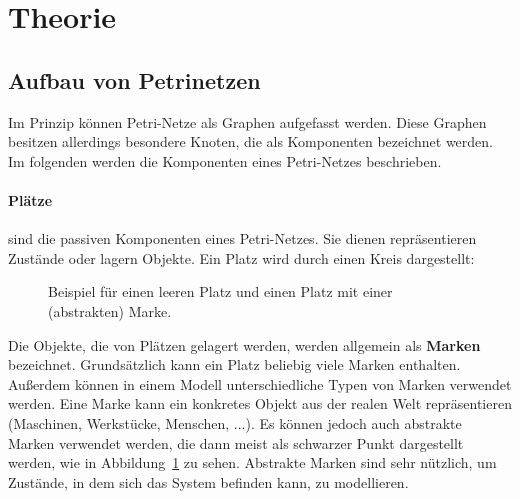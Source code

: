 \section{Theorie}


\subsection{Aufbau von Petrinetzen} %
\label{sub:aufbau_von_petrinetzen}
	Im Prinzip können Petri-Netze als Graphen aufgefasst werden.
	Diese Graphen besitzen allerdings besondere Knoten, die als Komponenten bezeichnet werden.
	Im folgenden werden die Komponenten eines Petri-Netzes beschrieben.

	\paragraph{Plätze} sind die passiven Komponenten eines Petri-Netzes. Sie dienen repräsentieren Zustände oder lagern Objekte.
	Ein Platz wird durch einen Kreis dargestellt:
	\begin{figure}[h]
		\centering
		\caption{Beispiel für einen leeren Platz und einen Platz mit einer (abstrakten) Marke.}
		\label{fig:platz}
	\end{figure}

	Die Objekte, die von Plätzen gelagert werden, werden allgemein als \textbf{Marken} bezeichnet. Grundsätzlich kann ein Platz beliebig viele Marken enthalten. Außerdem können in einem Modell unterschiedliche Typen von Marken verwendet werden. Eine Marke kann ein konkretes Objekt aus der realen Welt repräsentieren (Maschinen, Werkstücke, Menschen, ...). Es können jedoch auch abstrakte Marken verwendet werden, die dann meist als schwarzer Punkt dargestellt werden, wie in Abbildung~\ref{fig:platz} zu sehen. Abstrakte Marken sind sehr nützlich, um Zustände, in dem sich das System befinden kann, zu modellieren.

